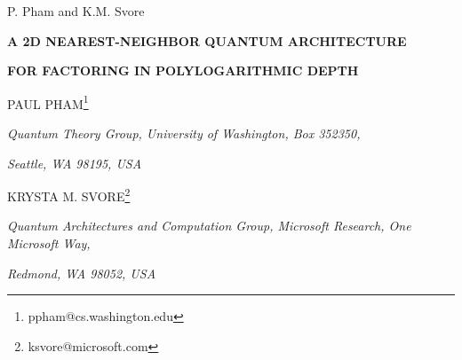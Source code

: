 \documentclass[twoside]{article}
\begin{document}
\setlength{\textheight}{8.0truein}    %

            {P. Pham and K.M. Svore}

\normalsize\textlineskip
\thispagestyle{empty}
\setcounter{page}{937}


\vspace*{0.88truein}

\alphfootnote


\centerline{\bf
A 2D NEAREST-NEIGHBOR QUANTUM ARCHITECTURE }\vspace{0.1in}
\centerline{\bf FOR FACTORING IN POLYLOGARITHMIC DEPTH}
\vspace*{0.37truein}
\centerline{\footnotesize
PAUL PHAM\footnote{ppham@cs.washington.edu}}
\vspace*{0.015truein}
\centerline{\footnotesize\it Quantum Theory Group, University of Washington, Box 352350,}
\baselineskip=10pt
\centerline{\footnotesize\it Seattle, WA 98195, USA}
\vspace*{10pt}
\centerline{\footnotesize
KRYSTA M. SVORE\footnote{ksvore@microsoft.com}}
\vspace*{0.015truein}
\centerline{\footnotesize\it Quantum Architectures and Computation Group, Microsoft Research, One Microsoft Way,}
\baselineskip=10pt
\centerline{\footnotesize\it Redmond, WA 98052, USA}
\vspace*{0.225truein}

\vspace*{0.21truein}
\end{document}
